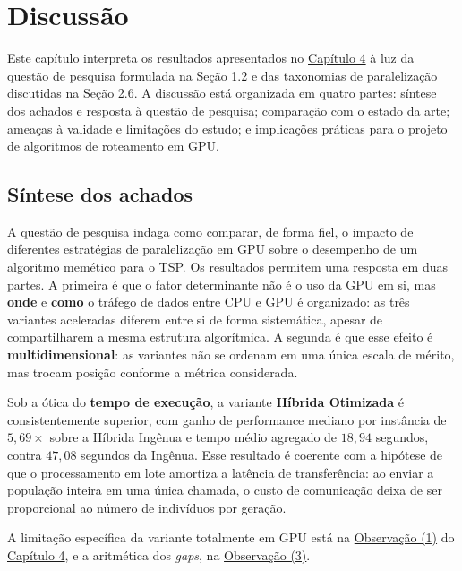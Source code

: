 \chapter{Discussão}\label{sec:discussao}

Este capítulo interpreta os resultados apresentados no \hyperref[cap4-resultados]{Capítulo 4} à luz da questão de pesquisa formulada na \hyperref[sec-12-problema-de-pesquisa]{Seção 1.2} e das taxonomias de paralelização discutidas na \hyperref[sec-26-gpu-metaheuristicas]{Seção 2.6}.
A discussão está organizada em quatro partes: síntese dos achados e resposta à questão de pesquisa; comparação com o estado da arte; ameaças à validade e limitações do estudo; e implicações práticas para o projeto de algoritmos de roteamento em GPU.

\section{Síntese dos achados}\label{sec-51-sintese-achados}

A questão de pesquisa indaga como comparar, de forma fiel, o impacto de diferentes estratégias de paralelização em GPU sobre o desempenho de um algoritmo memético para o TSP. Os resultados permitem uma resposta em duas partes.
A primeira é que o fator determinante não é o uso da GPU em si, mas \textbf{onde} e \textbf{como} o tráfego de dados entre CPU e GPU é organizado: as três variantes aceleradas diferem entre si de forma sistemática, apesar de compartilharem a mesma estrutura algorítmica.
A segunda é que esse efeito é \textbf{multidimensional}: as variantes não se ordenam em uma única escala de mérito, mas trocam posição conforme a métrica considerada.

Sob a ótica do \textbf{tempo de execução}, a variante \textbf{Híbrida Otimizada} é consistentemente superior, com ganho de performance mediano por instância de \(5{,}69\times\) sobre a Híbrida Ingênua e tempo médio agregado de \(18{,}94\) segundos, contra \(47{,}08\) segundos da Ingênua.
Esse resultado é coerente com a hipótese de que o processamento em lote amortiza a latência de transferência: ao enviar a população inteira em uma única chamada, o custo de comunicação deixa de ser proporcional ao número de indivíduos por geração.

\begin{warning}\label{obs-discussao-provisoria}
  A limitação específica da variante totalmente em GPU está na \hyperref[obs-fullgpu-iteracoes]{Observação (1)} do \hyperref[cap4-resultados]{Capítulo 4}, e a aritmética dos \emph{gaps}, na \hyperref[obs-aritmetica]{Observação (3)}.
\end{warning}

